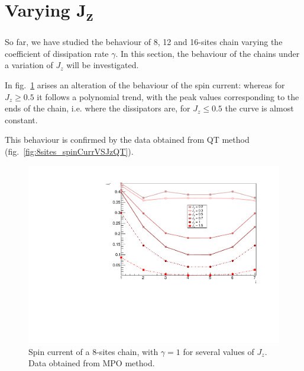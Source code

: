 \section{Varying J\textsubscript{z}}
So far, we have studied the behaviour of 8, 12 and 16-sites chain varying the coefficient of dissipation rate $\gamma$. In this section, the behaviour of the chains under a variation of $J_z$ will be investigated.

In fig.~\ref{fig:8sites_spinCurrVSJz} arises an alteration of the behaviour of the spin current: whereas for $J_z \geq 0.5$ it follows a polynomial trend, with the peak values corresponding to the ends of the chain, i.e. where the dissipators are, for $J_z \leq 0.5$ the curve is almost constant. 

This behaviour is confirmed by the data obtained from QT method (fig.~\ref{fig:8sites_spinCurrVSJzQT}).

\begin{figure}[H]
    \centering
    \includegraphics[scale=0.7]{Figures/8sites_spinCurrVSJz.pdf}
    \caption{Spin current of a 8-sites chain, with $\gamma = 1$ for several values of $J_z$. Data obtained from MPO method.}
    \label{fig:8sites_spinCurrVSJz}
\end{figure}

